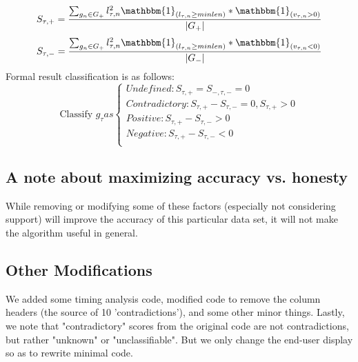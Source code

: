 \documentclass[12pt, a4, epsf] {article}
\theoremstyle{plain}
\theoremstyle{definition}
\begin{document}
\begin{equation}
S_{\tau,+} = \frac{\sum_{g_n \in G_+}{l^2_{\tau,n}\mathbbm{1}_{(l_{\tau,n}\geq minlen)}*\mathbbm{1}_{(v_{\tau,n}>0)}}}{|G_+|}
\end{equation}
\begin{equation}
S_{\tau,-} = \frac{\sum_{g_n \in G_+}{l^2_{\tau,n}\mathbbm{1}_{(l_{\tau,n}\geq minlen)}*\mathbbm{1}_{(v_{\tau,n}<0)}}}{|G_-|}
\end{equation}
Formal result classification is as follows:\\
\begin{equation}
\text{Classify } g_{\tau} as 
    \begin{cases}
      Undefined: S_{\tau,+} = S_{-,\tau,-} = 0\\
      Contradictory: S_{\tau,+} - S_{\tau,-} = 0, S_{\tau,+} > 0\\
      Positive: S_{\tau,+} - S_{\tau,-} > 0\\
      Negative: S_{\tau,+} - S_{\tau,-} < 0 \\
    \end{cases}   
\end{equation}
\subsection*{A note about maximizing accuracy vs. honesty}
While removing or modifying some of these factors (especially not considering support) will improve the accuracy of this particular data set, it will not make the algorithm useful in general.
\subsection*{Other Modifications}
We added some timing analysis code, modified code to remove the column headers (the source of 10 'contradictions'), and some other minor things. Lastly, we note that "contradictory" scores from the original code are not contradictions, but rather "unknown" or "unclassifiable". But we only change the end-user display so as to rewrite minimal code. 
\end{document}

